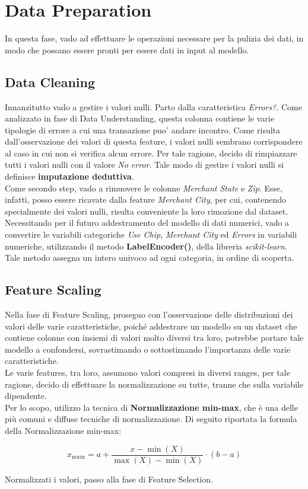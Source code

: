 \documentclass[]{article}
\begin{document}
\section{Data Preparation}
    In questa fase, vado ad effettuare le operazioni necessare per la pulizia dei dati, in modo che possano essere pronti per essere dati in input al modello.
    \subsection{Data Cleaning}
        Innanzitutto vado a gestire i valori nulli. Parto dalla caratteristica \textit{Errors?}. Come analizzato in fase di Data Understanding, questa colonna contiene le varie tipologie di errore a cui una transazione puo' andare incontro.
        Come risulta dall'osservazione dei valori di questa feature, i valori nulli sembrano corrispondere al caso in cui non si verifica alcun errore. Per tale ragione, decido di rimpiazzare tutti i valori nulli con il valore \textit{No error}. Tale modo di gestire i valori nulli si definisce \textbf{imputazione deduttiva}.\\
        Come secondo step, vado a rimuovere le colonne \textit{Merchant State} e \textit{Zip}. Esse, infatti, posso essere ricavate dalla feature \textit{Merchant City}, per cui, contenendo specialmente dei valori nulli, risulta conveniente la loro rimozione dal dataset.\\
        Necessitando per il futuro addestramento del modello di dati numerici, vado a convertire le variabili categoriche \textit{Use Chip}, \textit{Merchant City} ed \textit{Errors} in variabili numeriche, utilizzando il metodo \textbf{LabelEncoder()}, della libreria \textit{scikit-learn}. Tale metodo assegna un intero univoco ad ogni categoria, in ordine di scoperta.
    \subsection{Feature Scaling}
        Nella fase di Feature Scaling, proseguo con l'osservazione delle distribuzioni dei valori delle varie caratteristiche, poiché addestrare un modello su un dataset che contiene colonne con insiemi di valori molto diversi tra loro, potrebbe portare tale modello a confondersi, sovrastimando o sottostimando l'importanza delle varie caratteristiche.\\
        Le varie features, tra loro, assumono valori compresi in diversi ranges, per tale ragione, decido di effettuare la normalizzazione su tutte, tranne che sulla variabile dipendente.\\
        Per lo scopo, utilizzo la tecnica di \textbf{Normalizzazione min-max}, che è una delle più comuni e diffuse tecniche di normalizzazione.
        Di seguito riportata la formula della Normalizzazione min-max:
        \begin{center}
            \[
                x_{\text{norm}} = a + \frac{{x - \min(X)}}{{\max(X) - \min(X)}} \cdot (b - a)
            \]
        \end{center}
        Normalizzati i valori, passo alla fase di Feature Selection.
\end{document}
